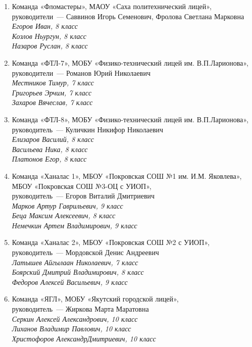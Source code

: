 \begin{enumerate}
\item Команда «Фломастеры», МАОУ «Саха политехнический лицей», \\
руководители~— Саввинов Игорь Семенович, Фролова Светлана Марковна \\
\it
\indent Егоров Иван, 8 класс \\
\indent Козлов Ньургун, 8 класс \\
\indent Назаров Руслан, 8 класс
\rm

\item Команда «ФТЛ-7», МОБУ «Физико-технический лицей им. В.П.Ларионова», \\
руководители~— Романов Юрий Николаевич \\
\it
\indent Местников Тимур, 7 класс \\
\indent Григорьев Эрчим, 7 класс \\
\indent Захаров Вячеслав, 7 класс
\rm

\item Команда «ФТЛ-8», МОБУ «Физико-технический лицей им. В.П.Ларионова», \\
руководитель~— Куличкин Никифор Николаевич \\
\it
\indent Елизаров Василий, 8 класс \\
\indent Васильева Ника, 8 класс \\
\indent Платонов Егор, 8 класс
\rm

\item Команда «Ханалас 1»,  МБОУ «Покровская СОШ №1 им. И.М. Яковлева», МБОУ «Покровская СОШ №3-ОЦ с УИОП», \\
руководитель~— Егоров Виталий Дмитриевич \\
\it
\indent Марков Артур Гаврильевич, 9 класс \\
\indent Беца Максим Алексеевич, 8 класс \\
\indent Немечкин Артем Владимирович, 9 класс
\rm

\item Команда «Ханалас 2»,  МБОУ «Покровская СОШ №2 с УИОП», \\
руководитель~— Мордовской Денис Андреевич \\
\it
\indent Латышев Айгылаан Николаевич, 7 класс \\
\indent Боярский Дмитрий Владимирович, 8 класс \\
\indent Федоров Алексей Васильевич, 9 класс
\rm

\item Команда «ЯГЛ», МОБУ «Якутский городской лицей», \\
руководитель~— Жиркова Марта Маратовна \\
\it
\indent Серкин Алексей Александрович, 10 класс \\
\indent Лиханов Владимир Павлович, 10 класс \\
\indent Христофоров АлександрДмитриевич, 10 класс
\rm


\end{enumerate}
